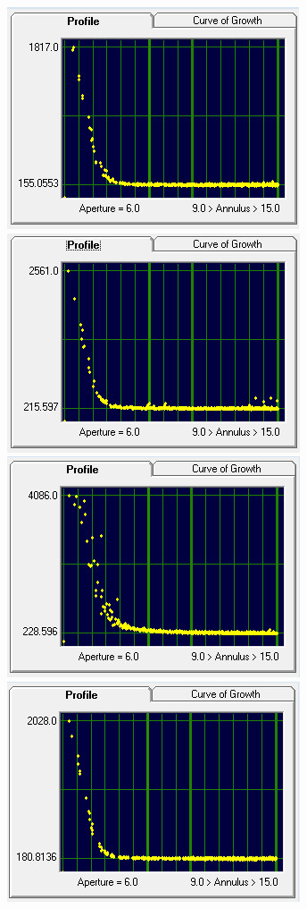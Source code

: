\documentclass[12pt]{article}
\begin{document}
\begin{figure}[H]
\centering
\begin{multicols}{2}
\includegraphics[scale=1.0]{Images/AsImages/SI/Sr1-Profile.PNG} \\ [0.2cm]
\includegraphics[scale=1.0]{Images/AsImages/SI/Sr3-Profile.PNG}
\includegraphics[scale=1.0]{Images/AsImages/SI/Sr2-Profile.PNG} \\ [0.2cm]
\includegraphics[scale=1.0]{Images/AsImages/SI/Sr4-Profile.PNG}

\end{multicols}
\end{figure}
\end{document}
